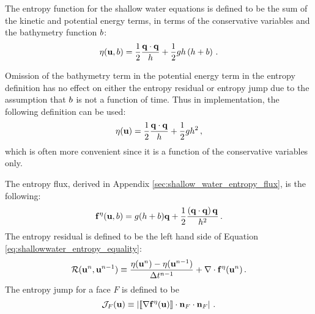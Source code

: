 The entropy function for the shallow water equations is defined to be
the sum of the kinetic and potential energy terms, in terms of the
conservative variables and the bathymetry function $b$:
\begin{equation}
  \eta(\mathbf{u},b)
  = \frac{1}{2}\frac{\mathbf{q}\cdot\mathbf{q}}
  {h} + \frac{1}{2}gh\left(h+b\right)
  \,.
\end{equation}
\begin{remark}
Omission of the bathymetry term in the potential energy
term in the entropy definition has no effect on either the entropy
residual or entropy jump due to the assumption that $b$ is
not a function of time. Thus in implementation, the following definition
can be used:
\begin{equation}
  \eta(\mathbf{u})
  = \frac{1}{2}\frac{\mathbf{q}\cdot\mathbf{q}}
  {h} + \frac{1}{2}gh^2
  \,,
\end{equation}
which is often more convenient since it is a function of the conservative
variables only.
\end{remark}
The entropy flux, derived in Appendix \ref{sec:shallow_water_entropy_flux}, is the
following:
\begin{equation}
  \mathbf{f}^\eta(\mathbf{u},b)
  = g(h + b)\mathbf{q}
  + \frac{1}{2}\frac{\left(\mathbf{q}\cdot\mathbf{q}\right)\mathbf{q}} 
  {h^2}
  \,.
\end{equation}
The entropy residual is defined to be the left hand side of 
Equation \eqref{eq:shallowwater_entropy_equality}:
\begin{equation}
  \mathcal{R}(\mathbf{u}^n, \mathbf{u}^{n-1})
    \equiv \frac{\eta(\mathbf{u}^n)
      - \eta(\mathbf{u}^{n-1})}{\Delta t^{n-1}}
    + \nabla\cdot\mathbf{f}^\eta(\mathbf{u}^n)
  \,.
\end{equation}
The entropy jump for a face $F$ is defined to be
\begin{equation}
  \mathcal{J}_F(\mathbf{u})
  \equiv \left|
    \left\llbracket\nabla\mathbf{f}^\eta(\mathbf{u})\right\rrbracket
    \cdot\mathbf{n}_F\cdot\mathbf{n}_F
  \right| \,.
\end{equation}
